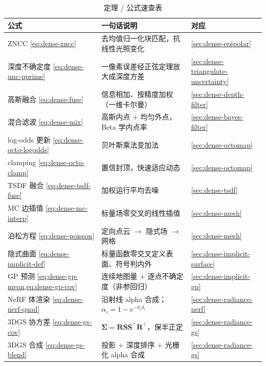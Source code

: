 \begin{table}[H]\centering\small
\caption{定理 / 公式速查表}
\begin{tabular}{lll}
\toprule
公式 & 一句话说明 & 对应 \\
\midrule
ZNCC \cref{eq:dense-zncc} & 去均值归一化块匹配，抗线性光照变化 & \cref{sec:dense-epipolar} \\
深度不确定度 \cref{eq:dense-unc-pprime} & 一像素误差经正弦定理放大成深度方差 & \cref{sec:dense-triangulate-uncertainty} \\
高斯融合 \cref{eq:dense-fuse} & 信息相加、按精度加权（一维卡尔曼）& \cref{sec:dense-depth-filter} \\
混合滤波 \cref{eq:dense-mix} & 高斯内点 $+$ 均匀外点，Beta 学内点率 & \cref{sec:dense-bayes-filter} \\
log-odds 更新 \cref{eq:dense-octo-logodds} & 贝叶斯乘法变加法 & \cref{sec:dense-octomap} \\
clamping \cref{eq:dense-octo-clamp} & 置信封顶，快速适应动态 & \cref{sec:dense-octomap} \\
TSDF 融合 \cref{eq:dense-tsdf-fuse} & 加权运行平均去噪 & \cref{sec:dense-tsdf} \\
MC 边插值 \cref{eq:dense-mc-interp} & 标量场零交叉的线性插值 & \cref{sec:dense-mesh} \\
泊松方程 \cref{eq:dense-poisson} & 定向点云 $\to$ 隐式场 $\to$ 网格 & \cref{sec:dense-mesh} \\
隐式曲面 \cref{eq:dense-implicit-def} & 标量函数零交叉定义表面、符号判内外 & \cref{sec:dense-implicit-surface} \\
GP 预测 \cref{eq:dense-gp-mean,eq:dense-gp-cov} & 连续地图量 $+$ 逐点不确定度（非参回归） & \cref{sec:dense-implicit-gp} \\
NeRF 体渲染 \cref{eq:dense-nerf-quad} & 沿射线 alpha 合成；$\alpha_i=1-e^{-\sigma_i\delta_i}$ & \cref{sec:dense-radiance-nerf} \\
3DGS 协方差 \cref{eq:dense-gs-cov} & $\boldsymbol{\Sigma}=\mathbf{R}\mathbf{S}\mathbf{S}^\top\mathbf{R}^\top$，保半正定 & \cref{sec:dense-radiance-gs} \\
3DGS 合成 \cref{eq:dense-gs-blend} & 投影 $+$ 深度排序 $+$ 光栅化 alpha 合成 & \cref{sec:dense-radiance-gs} \\
\bottomrule
\end{tabular}
\end{table}


